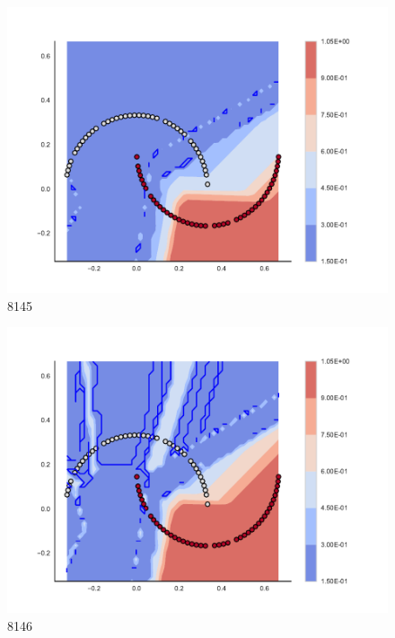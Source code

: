 \begin{subfigure}[b]{0.09\textwidth}
    \includegraphics[clip, trim=2.35cm 1.75cm 4.5cm 0cm,width=\textwidth]{img/convergence/8145.pdf}
    \caption{8145}
    \label{fig:convergence_8145}
\end{subfigure}
%
\begin{subfigure}[b]{0.09\textwidth}
    \includegraphics[clip, trim=2.35cm 1.75cm 4.5cm 0cm,width=\textwidth]{img/convergence/8146.pdf}
    \caption{8146}
    \label{fig:convergence_8146}
\end{subfigure}
%
